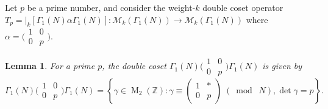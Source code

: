 \documentclass[10pt,leqno,twoside]{article}
\theoremstyle{plain}
\newtheorem{lemma}[lem]{Lemma}
\theoremstyle{definition}
\numberwithin{equation}{section}
\numberwithin{lem}{section}
\newcommand{\cbr}[1]{\left\{#1\right\}}
\DeclareMathOperator{\Mat}{M}
\newcommand{\smod}[1]{\;(\bmod\; #1)}
\begin{document}
Let $p$ be a prime number, and consider the weight-$k$ double coset operator $T_p = |_k[\varGamma_1(N)\alpha\varGamma_1(N)]\colon \mathcal M_k(\varGamma_1(N))\to \mathcal M_k(\varGamma_1(N))$ where $\alpha = \big(\!\begin{smallmatrix}
    1 & 0 \\ 0 & p
\end{smallmatrix}\!\big)$. 
\begin{lemma}\label{lem: replacement for T_n}
    For a prime $p$, the double coset $\varGamma_1(N)\big(\!\begin{smallmatrix}
        1 & 0 \\ 0 & p
    \end{smallmatrix}\!\big)\varGamma_1(N)$ is given by 
    \[\varGamma_1(N)\big(\!\begin{smallmatrix}
        1 & 0 \\ 0 & p
    \end{smallmatrix}\!\big)\varGamma_1(N) = \cbr{\gamma\in \Mat_2(\mathbb Z) : \gamma \equiv \begin{pmatrix}
        1 & \ast \\ 0 & p
    \end{pmatrix}\smod N, \det\gamma = p}.\]
\end{lemma}
\end{document}
